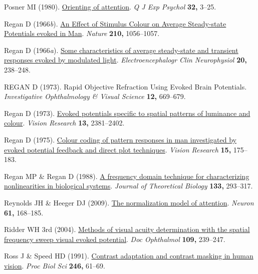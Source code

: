 \documentclass[
  letterpaper,
  DIV=11,
  numbers=noendperiod]{scrartcl}
\newlength{\cslhangindent}
\newenvironment{CSLReferences}[2] %
 {\begin{list}{}{%
  \setlength{\itemindent}{0pt}
  \setlength{\leftmargin}{0pt}
  \setlength{\parsep}{0pt}
  \ifodd #1
   \setlength{\leftmargin}{\cslhangindent}
   \setlength{\itemindent}{-1\cslhangindent}
  \fi
  \setlength{\itemsep}{#2\baselineskip}}}
 {\end{list}}
\begin{document}
\begin{CSLReferences}{1}{1}
Posner MI (1980).
\href{https://doi.org/10.1080/00335558008248231}{Orienting of
attention}. \emph{Q J Exp Psychol} \textbf{32,} 3--25.

Regan D (1966\emph{b}). \href{https://doi.org/10.1038/2101056a0}{An
{Effect} of {Stimulus Colour} on {Average Steady-state Potentials}
evoked in {Man}}. \emph{Nature} \textbf{210,} 1056--1057.

Regan D (1966\emph{a}).
\href{https://doi.org/10.1016/0013-4694(66)90088-5}{Some characteristics
of average steady-state and transient responses evoked by modulated
light}. \emph{Electroencephalogr Clin Neurophysiol} \textbf{20,}
238--248.

REGAN D (1973). Rapid {Objective Refraction Using Evoked Brain
Potentials}. \emph{Investigative Ophthalmology \& Visual Science}
\textbf{12,} 669--679.

Regan D (1973).
\href{https://doi.org/10.1016/0042-6989(73)90237-X}{Evoked potentials
specific to spatial patterns of luminance and colour}. \emph{Vision
Research} \textbf{13,} 2381--2402.

Regan D (1975).
\href{https://doi.org/10.1016/0042-6989(75)90205-9}{Colour coding of
pattern responses in man investigated by evoked potential feedback and
direct plot techniques}. \emph{Vision Research} \textbf{15,} 175--183.

Regan MP \& Regan D (1988).
\href{https://doi.org/10.1016/S0022-5193(88)80323-0}{A frequency domain
technique for characterizing nonlinearities in biological systems}.
\emph{Journal of Theoretical Biology} \textbf{133,} 293--317.

Reynolds JH \& Heeger DJ (2009).
\href{https://doi.org/10.1016/j.neuron.2009.01.002}{The normalization
model of attention}. \emph{Neuron} \textbf{61,} 168--185.

Ridder WH 3rd (2004).
\href{https://doi.org/10.1007/s10633-004-8053-7}{Methods of visual
acuity determination with the spatial frequency sweep visual evoked
potential}. \emph{Doc Ophthalmol} \textbf{109,} 239--247.

Ross J \& Speed HD (1991).
\href{https://doi.org/10.1098/rspb.1991.0125}{Contrast adaptation and
contrast masking in human vision}. \emph{Proc Biol Sci} \textbf{246,}
61--69.


\end{CSLReferences}
\end{document}
